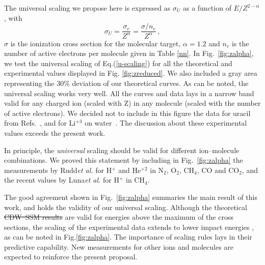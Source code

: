\documentclass[10pt,showpacs,showkeys,twocolumn]{revtex4-1} %
\providecommand{\DIFadd}[1]{{\protect\color{blue}\uwave{#1}}} %
\providecommand{\DIFdel}[1]{{\protect\color{red}\sout{#1}}}                      %
\providecommand{\DIFaddbegin}{} %
\providecommand{\DIFaddend}{} %
\providecommand{\DIFdelbegin}{} %
\providecommand{\DIFdelend}{} %
\newcommand{\DIFscaledelfig}{0.5}
\newlength{\DIFdelgraphicswidth} %
\newlength{\DIFdelgraphicsheight} %
\newcommand{\DIFaddincludegraphics}[2][]{{\color{blue}\fbox{\DIFOincludegraphics[#1]{#2}}}} %
\newcommand{\DIFdelincludegraphics}[2][]{%
\sbox{\DIFdelgraphicsbox}{\DIFOincludegraphics[#1]{#2}}%
\settoboxwidth{\DIFdelgraphicswidth}{\DIFdelgraphicsbox} %
\settoboxtotalheight{\DIFdelgraphicsheight}{\DIFdelgraphicsbox} %
\scalebox{\DIFscaledelfig}{%
\parbox[b]{\DIFdelgraphicswidth}{\usebox{\DIFdelgraphicsbox}\\[-\baselineskip] \rule{\DIFdelgraphicswidth}{0em}}\llap{\resizebox{\DIFdelgraphicswidth}{\DIFdelgraphicsheight}{%
\setlength{\unitlength}{\DIFdelgraphicswidth}%
\begin{picture}(1,1)%
\thicklines\linethickness{2pt} %
{\color[rgb]{1,0,0}\put(0,0){\framebox(1,1){}}}%
{\color[rgb]{1,0,0}\put(0,0){\line( 1,1){1}}}%
{\color[rgb]{1,0,0}\put(0,1){\line(1,-1){1}}}%
\end{picture}%
}\hspace*{3pt}}} %
} %
\DeclareRobustCommand{\DIFaddbegin}{\DIFOaddbegin \let\includegraphics\DIFaddincludegraphics} %
\DeclareRobustCommand{\DIFaddend}{\DIFOaddend \let\includegraphics\DIFOincludegraphics} %
\DeclareRobustCommand{\DIFdelbegin}{\DIFOdelbegin \let\includegraphics\DIFdelincludegraphics} %
\DeclareRobustCommand{\DIFdelend}{\DIFOaddend \let\includegraphics\DIFOincludegraphics} %
\begin{document}
The universal scaling we propose here is expressed as $\sigma_U$ as a 
function of $E/Z^{2-\alpha}$, with
 \begin{equation}
     \sigma_U=\frac{\sigma_e}{Z^{\alpha}}=\frac{\sigma/n_e}{Z^{\alpha}}\,,
     \label{u-scaling}
 \end{equation}
$\sigma$ is the ionization cross section for the molecular target, 
$\alpha=1.2$ and $n_e$ is the number of active electrons per molecule 
given in Table \ref{nn}. In Fig.~\ref{fig:zalpha}, we test the universal 
scaling of Eq.\DIFaddbegin \DIFadd{~}\DIFaddend (\ref{u-scaling}) for all the theoretical and 
experimental values displayed in Fig. \ref{fig:zreduced}. We also 
included a gray area representing the 30\% deviation of our theoretical 
curves. As can be noted, the universal scaling works very well. All the 
curves and data lays in a narrow band valid for any charged ion (scaled 
with Z) in any molecule (scaled with the number of active electrons). 
We decided not to include in this figure the data for uracil from 
Refs.~\cite{agnihotri2012,agnihotri2013}, and for Li$^{+3}$ on 
water~\cite{Luna_Li_water}. The discussion about these experimental 
values exceeds the present work. %

In principle, the \textit{universal} scaling should be valid for 
different ion--molecule combinations. We proved this statement by 
including in Fig.~\ref{fig:zalpha} the measurements by 
Rudd\DIFaddbegin \DIFadd{~}\DIFaddend \textit{et al.} \cite{Rudd85,Rudd1983} for H$^{+}$ and He$^{+2}$ 
in N$_2$, O$_2$, CH$_4$, CO and CO$_2$, and the recent values by 
Luna\DIFaddbegin \DIFadd{~}\DIFaddend \textit{et al.} \cite{Luna2019} for H$^{+}$ in CH$_4$. 

The good agreement shown in Fig.~\ref{fig:zalpha} summaries the main 
result of this work, and holds the validity of our universal scaling. 
Although the theoretical \DIFdelbegin \DIFdel{CDW--SSM results %
}\DIFdelend \DIFaddbegin \DIFadd{CDW-SSM results }\DIFaddend are valid for energies above 
the maximum of the cross sections, the scaling of the experimental data 
extends to lower impact energies%
, as can be noted in 
Fig.\DIFaddbegin \DIFadd{~}\DIFaddend \ref{fig:zalpha}. The importance of scaling rules lays in their 
predictive capability. New measurements for other ions and molecules 
are expected to reinforce the present proposal. 

\end{document}
